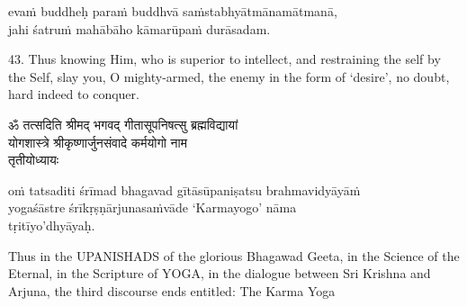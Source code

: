 \begin{transliteration}
evaṁ buddheḥ paraṁ buddhvā saṁstabhyātmānamātmanā, \\
jahi śatruṁ mahābāho kāmarūpaṁ durāsadam.
\end{transliteration}

43. Thus knowing Him, who is superior to intellect, and restraining the self by
the Self, slay you, O mighty-armed, the enemy in the form of `desire', no
doubt, hard indeed to conquer.

\begin{gitaverse}
ॐ तत्सदिति श्रीमद् भगवद् गीतासूपनिषत्सु ब्रह्मविद्यायां \\
योगशास्त्रे श्रीकृष्णार्जुनसंवादे कर्मयोगो नाम \\
तृतीयोध्यायः
\end{gitaverse}

\begin{transliteration}
oṁ tatsaditi śrīmad bhagavad gītāsūpaniṣatsu brahmavidyāyāṁ \\
yogaśāstre śrīkṛṣṇārjunasaṁvāde `Karmayogo' nāma \\
tṛitīyo'dhyāyaḥ.
\end{transliteration}

Thus in the UPANISHADS of the glorious Bhagawad Geeta, in the Science of the
Eternal, in the Scripture of YOGA, in the dialogue between Sri Krishna and
Arjuna, the third discourse ends entitled: The Karma Yoga
